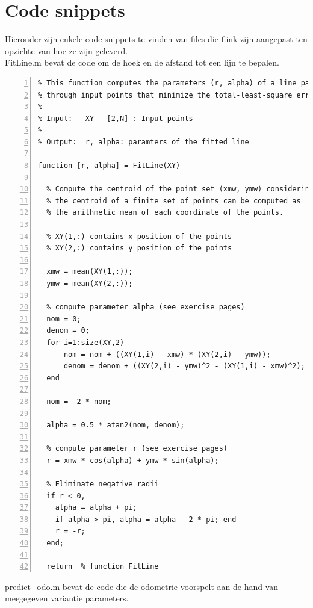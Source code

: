\documentclass[a4paper]{article}
\begin{document}
\section{Code snippets}
Hieronder zijn enkele code snippets te vinden van files die flink zijn aangepast ten opzichte van hoe ze zijn geleverd.\\
FitLine.m bevat de code om de hoek en de afstand tot een lijn te bepalen.
\begin{lstlisting}[caption= Fitline.m, label=lst:checkconcat, numbers=left]
%---------------------------------------------------------------------
% This function computes the parameters (r, alpha) of a line passing
% through input points that minimize the total-least-square error.
%
% Input:   XY - [2,N] : Input points
%          
% Output:  r, alpha: paramters of the fitted line

function [r, alpha] = FitLine(XY)
  
  % Compute the centroid of the point set (xmw, ymw) considering that 
  % the centroid of a finite set of points can be computed as
  % the arithmetic mean of each coordinate of the points.

  % XY(1,:) contains x position of the points
  % XY(2,:) contains y position of the points  

  xmw = mean(XY(1,:));
  ymw = mean(XY(2,:));

  % compute parameter alpha (see exercise pages)
  nom = 0;
  denom = 0;
  for i=1:size(XY,2)
      nom = nom + ((XY(1,i) - xmw) * (XY(2,i) - ymw));
      denom = denom + ((XY(2,i) - ymw)^2 - (XY(1,i) - xmw)^2);
  end
  
  nom = -2 * nom;
  
  alpha = 0.5 * atan2(nom, denom);
  
  % compute parameter r (see exercise pages)
  r = xmw * cos(alpha) + ymw * sin(alpha);
  
  % Eliminate negative radii
  if r < 0,
    alpha = alpha + pi;
    if alpha > pi, alpha = alpha - 2 * pi; end
    r = -r;
  end;
  
  return  % function FitLine
\end{lstlisting}
\newpage
\noindent
predict\_odo.m bevat de code die de odometrie voorspelt aan de hand van meegegeven variantie parameters.
\end{document}
